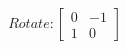 \documentclass[preview]{standalone}
\begin{document}
\begin{align*}
Rotate: \begin{bmatrix} 0 & -1 \\ 1 & 0 \end{bmatrix}
\end{align*}
\end{document}
